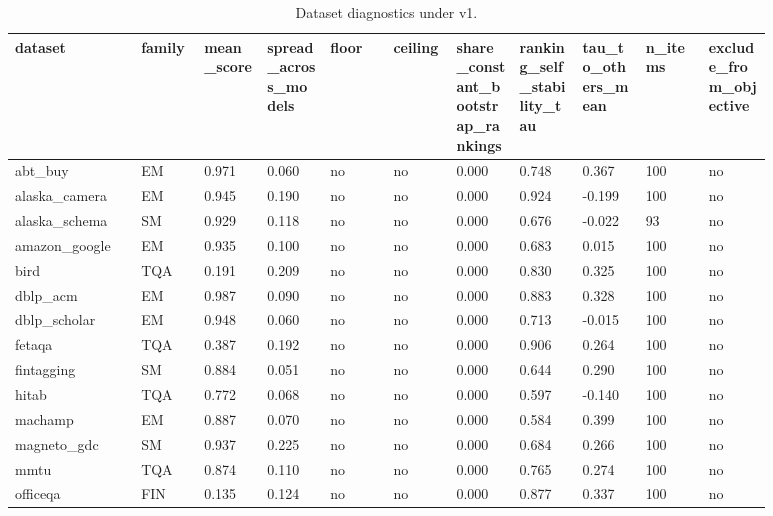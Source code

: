\begin{landscape}
\tiny
\setlength{\tabcolsep}{3pt}
\begin{longtable}{p{0.147\linewidth}p{0.073\linewidth}p{0.073\linewidth}p{0.073\linewidth}p{0.073\linewidth}p{0.073\linewidth}p{0.073\linewidth}p{0.073\linewidth}p{0.073\linewidth}p{0.073\linewidth}p{0.073\linewidth}}
\caption{Dataset diagnostics under v1.}\label{tab:diagnostics}\\
\toprule
dataset & family & mean\_\allowbreak{}score & spread\_\allowbreak{}across\_\allowbreak{}models & floor & ceiling & share\_\allowbreak{}constant\_\allowbreak{}bootstrap\_\allowbreak{}rankings & ranking\_\allowbreak{}self\_\allowbreak{}stability\_\allowbreak{}tau & tau\_\allowbreak{}to\_\allowbreak{}others\_\allowbreak{}mean & n\_\allowbreak{}items & exclude\_\allowbreak{}from\_\allowbreak{}objective \\
\midrule
abt\_\allowbreak{}buy & EM & 0.971 & 0.060 & no & no & 0.000 & 0.748 & 0.367 & 100 & no \\
alaska\_\allowbreak{}camera & EM & 0.945 & 0.190 & no & no & 0.000 & 0.924 & -0.199 & 100 & no \\
alaska\_\allowbreak{}schema & SM & 0.929 & 0.118 & no & no & 0.000 & 0.676 & -0.022 & 93 & no \\
amazon\_\allowbreak{}google & EM & 0.935 & 0.100 & no & no & 0.000 & 0.683 & 0.015 & 100 & no \\
bird & TQA & 0.191 & 0.209 & no & no & 0.000 & 0.830 & 0.325 & 100 & no \\
dblp\_\allowbreak{}acm & EM & 0.987 & 0.090 & no & no & 0.000 & 0.883 & 0.328 & 100 & no \\
dblp\_\allowbreak{}scholar & EM & 0.948 & 0.060 & no & no & 0.000 & 0.713 & -0.015 & 100 & no \\
fetaqa & TQA & 0.387 & 0.192 & no & no & 0.000 & 0.906 & 0.264 & 100 & no \\
fintagging & SM & 0.884 & 0.051 & no & no & 0.000 & 0.644 & 0.290 & 100 & no \\
hitab & TQA & 0.772 & 0.068 & no & no & 0.000 & 0.597 & -0.140 & 100 & no \\
machamp & EM & 0.887 & 0.070 & no & no & 0.000 & 0.584 & 0.399 & 100 & no \\
magneto\_\allowbreak{}gdc & SM & 0.937 & 0.225 & no & no & 0.000 & 0.684 & 0.266 & 100 & no \\
mmtu & TQA & 0.874 & 0.110 & no & no & 0.000 & 0.765 & 0.274 & 100 & no \\
officeqa & FIN & 0.135 & 0.124 & no & no & 0.000 & 0.877 & 0.337 & 100 & no \\

\end{longtable}
\end{landscape}

